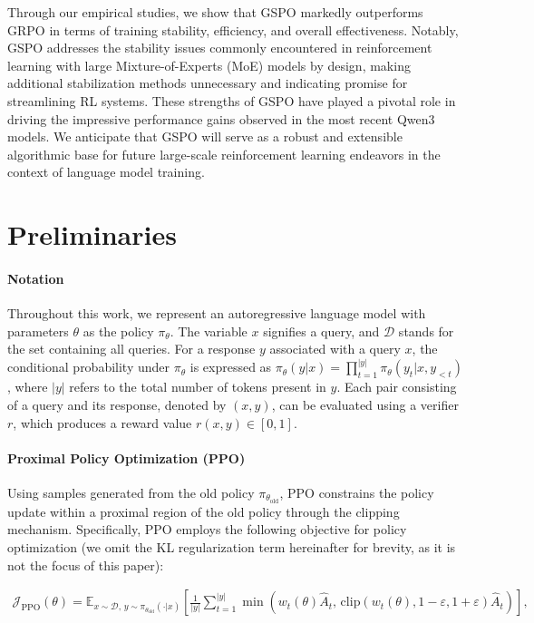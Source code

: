 Through our empirical studies, we show that GSPO markedly outperforms GRPO in terms of training stability, efficiency, and overall effectiveness. Notably, GSPO addresses the stability issues commonly encountered in reinforcement learning with large Mixture-of-Experts (MoE) models by design, making additional stabilization methods unnecessary and indicating promise for streamlining RL systems. These strengths of GSPO have played a pivotal role in driving the impressive performance gains observed in the most recent Qwen3 models. We anticipate that GSPO will serve as a robust and extensible algorithmic base for future large-scale reinforcement learning endeavors in the context of language model training.

\section{Preliminaries}

\paragraph{Notation}
Throughout this work, we represent an autoregressive language model with parameters $\theta$ as the policy $\pi_\theta$. The variable $x$ signifies a query, and $\mathcal{D}$ stands for the set containing all queries. For a response $y$ associated with a query $x$, the conditional probability under $\pi_\theta$ is expressed as $\pi_\theta (y | x) = \prod_{t=1}^{|y|} \pi_\theta (y_t | x, y_{<t})$, where $|y|$ refers to the total number of tokens present in $y$. Each pair consisting of a query and its response, denoted by $(x, y)$, can be evaluated using a verifier $r$, which produces a reward value $r(x, y) \in [0, 1]$.

\paragraph{Proximal Policy Optimization (PPO)} Using samples generated from the old policy $\pi_{\theta_\text{old}}$, PPO \citep{ppo} constrains the policy update within a proximal region of the old policy through the clipping mechanism. Specifically, PPO employs the following objective for policy optimization (we omit the KL regularization term hereinafter for brevity, as it is not the focus of this paper):

\begin{align}
\mathcal{J}_\text{PPO}(\theta) = \mathbb{E}_{ x \sim \mathcal{D},\, y \sim \pi_{\theta_\text{old}}( \cdot | x) }
\left[ \frac{1}{|y|} \sum_{t=1}^{|y|} 
\min \left( w_{t}(\theta) \widehat{A}_{t},  \, \mathrm{clip} \left( w_{t}(\theta), 1 - {\varepsilon}, 1 + {\varepsilon}\right) \widehat{A}_{t} \right)
\right],
\end{align}

